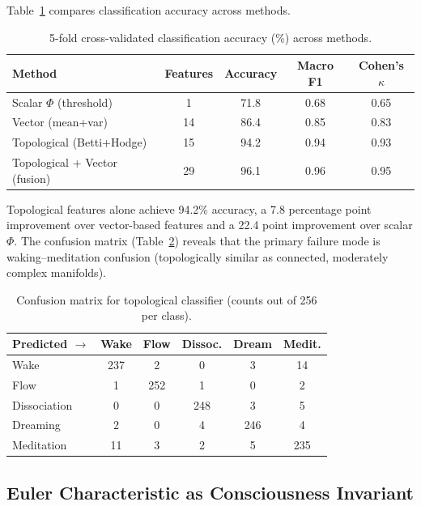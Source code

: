\documentclass[11pt,a4paper]{article}
\begin{document}
Table~\ref{tab:classification} compares classification accuracy across methods.

\begin{table}[h]
\centering
\caption{5-fold cross-validated classification accuracy (\%) across methods.}
\label{tab:classification}
\begin{tabular}{lcccc}
\toprule
\textbf{Method} & \textbf{Features} & \textbf{Accuracy} & \textbf{Macro F1} & \textbf{Cohen's $\kappa$} \\
\midrule
Scalar $\Phi$ (threshold)     & 1  & 71.8 & 0.68 & 0.65 \\
Vector (mean+var)             & 14 & 86.4 & 0.85 & 0.83 \\
Topological (Betti+Hodge)     & 15 & 94.2 & 0.94 & 0.93 \\
Topological + Vector (fusion) & 29 & 96.1 & 0.96 & 0.95 \\
\bottomrule
\end{tabular}
\end{table}

Topological features alone achieve 94.2\% accuracy, a 7.8 percentage point improvement over vector-based features and a 22.4 point improvement over scalar $\Phi$.
The confusion matrix (Table~\ref{tab:confusion}) reveals that the primary failure mode is waking--meditation confusion (topologically similar as connected, moderately complex manifolds).

\begin{table}[h]
\centering
\caption{Confusion matrix for topological classifier (counts out of 256 per class).}
\label{tab:confusion}
\begin{tabular}{lccccc}
\toprule
\textbf{Predicted $\to$} & Wake & Flow & Dissoc. & Dream & Medit. \\
\midrule
Wake         & 237 &  2  &  0  &  3  & 14 \\
Flow         &   1 & 252 &  1  &  0  &  2 \\
Dissociation &   0 &  0  & 248 &  3  &  5 \\
Dreaming     &   2 &  0  &  4  & 246 &  4 \\
Meditation   &  11 &  3  &  2  &  5  & 235 \\
\bottomrule
\end{tabular}
\end{table}

\subsection{Euler Characteristic as Consciousness Invariant}
\end{document}
